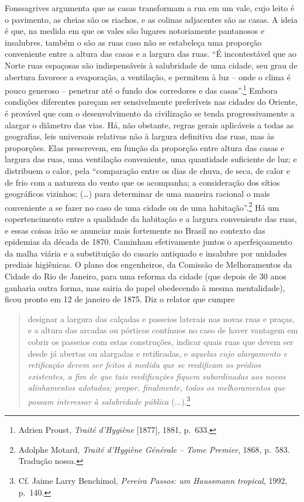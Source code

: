 Fonssagrives argumenta que as casas transformam a rua em um vale, cujo
leito é o pavimento, as cheias são os riachos, e as colinas adjacentes
são as casas. A ideia é que, na medida em que os vales são lugares
notoriamente pantanosos e insalubres, também o são as ruas caso não se
estabeleça uma proporção conveniente entre a altura das casas e a
largura das ruas. ``É incontestável que ao Norte ruas espaçosas são
indispensáveis à salubridade de uma cidade, seu grau de abertura
favorece a evaporação, a ventilação, e permitem à luz -- onde o clima é
pouco generoso -- penetrar até o fundo dos corredores e das
casas''.\footnote{Adrien Proust, \emph{Traité d'Hygiène} {[}1877{]},
  1881, p.~633.} Embora condições diferentes pareçam ser sensivelmente
preferíveis nas cidades do Oriente, é provável que com o desenvolvimento
da civilização se tenda progressivamente a alargar o diâmetro das vias.
Há, não obstante, regras gerais aplicáveis a todas as geografias, leis
universais relativas não à largura definitiva das ruas, mas às
proporções. Elas prescrevem, em função da proporção entre altura das
casas e largura das ruas, uma ventilação conveniente, uma quantidade
suficiente de luz; e distribuem o calor, pela ``comparação entre os dias
de chuva, de seca, de calor e de frio com a natureza do vento que os
acompanha; a consideração dos sítios geográficos vizinhos; (\ldots{})
para determinar de uma maneira racional o mais conveniente a se fazer no
caso de uma cidade ou de uma habitação''.\footnote{Adolphe Motard,
  \emph{Traité d'Hygiène Générale} \emph{-- Tome Premier}, 1868, p.~583.
  Tradução nossa.} Há um copertencimento entre a qualidade da habitação
e a largura conveniente das ruas, e essas coisas irão se anunciar mais
fortemente no Brasil no contexto das epidemias da década de 1870.
Caminham efetivamente juntos o aperfeiçoamento da malha viária e a
substituição do casario antiquado e insalubre por unidades prediais
higiênicas. O plano dos engenheiros, da Comissão de Melhoramentos da
Cidade do Rio de Janeiro, para uma reforma da cidade (que depois de 30
anos ganharia outra forma, mas sairia do papel obedecendo à mesma
mentalidade), ficou pronto em 12 de janeiro de 1875. Diz o relator que
cumpre

\begin{quote}
designar a largura das calçadas e passeios laterais nas novas ruas e
praças, e a altura das arcadas ou pórticos contínuos no caso de haver
vantagem em cobrir os passeios com estas construções, indicar quais ruas
que devem ser desde já abertas ou alargadas e retificadas, e
\emph{aquelas cujo alargamento e retificação devem ser feitos à medida
que se reedificam os prédios existentes, a fim de que tais reedificações
fiquem subordinadas aos novos alinhamentos adotados; propor, finalmente,
todos os melhoramentos que possam interessar à salubridade pública}
(...).\footnote{Cf. Jaime Larry Benchimol, \emph{Pereira Passos: um
  Haussmann tropical}, 1992, p.~140.}
\end{quote}

